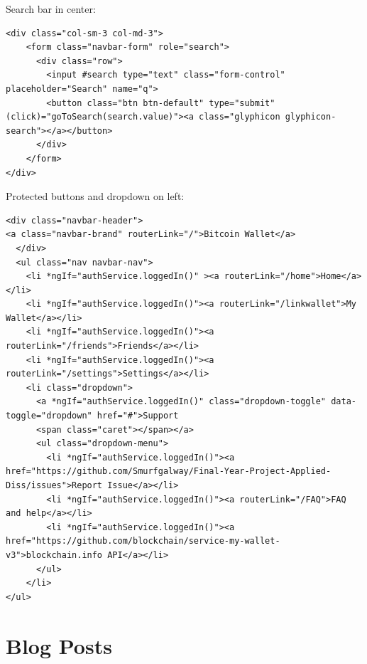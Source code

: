 Search bar in center:
\begin{lstlisting}
<div class="col-sm-3 col-md-3">
    <form class="navbar-form" role="search">
      <div class="row">
        <input #search type="text" class="form-control" placeholder="Search" name="q">
        <button class="btn btn-default" type="submit" (click)="goToSearch(search.value)"><a class="glyphicon glyphicon-search"></a></button>
      </div>
    </form>
</div>
\end{lstlisting}

Protected buttons and dropdown on left:
\begin{lstlisting}
<div class="navbar-header">
<a class="navbar-brand" routerLink="/">Bitcoin Wallet</a>
  </div>
  <ul class="nav navbar-nav">
    <li *ngIf="authService.loggedIn()" ><a routerLink="/home">Home</a></li>
    <li *ngIf="authService.loggedIn()"><a routerLink="/linkwallet">My Wallet</a></li>
    <li *ngIf="authService.loggedIn()"><a routerLink="/friends">Friends</a></li>
    <li *ngIf="authService.loggedIn()"><a routerLink="/settings">Settings</a></li>
    <li class="dropdown">
      <a *ngIf="authService.loggedIn()" class="dropdown-toggle" data-toggle="dropdown" href="#">Support
      <span class="caret"></span></a>
      <ul class="dropdown-menu">
        <li *ngIf="authService.loggedIn()"><a href="https://github.com/Smurfgalway/Final-Year-Project-Applied-Diss/issues">Report Issue</a></li>
        <li *ngIf="authService.loggedIn()"><a routerLink="/FAQ">FAQ and help</a></li>
        <li *ngIf="authService.loggedIn()"><a href="https://github.com/blockchain/service-my-wallet-v3">blockchain.info API</a></li>
      </ul>
    </li>
</ul>
\end{lstlisting}

\section{Blog Posts}

